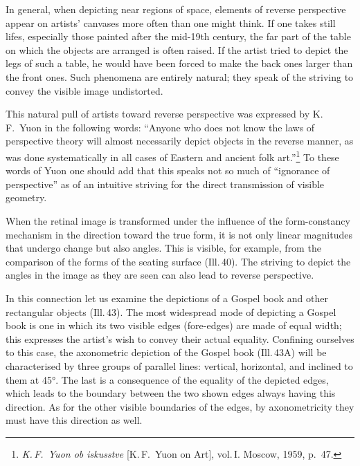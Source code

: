 

In general, when depicting near regions of space, elements of reverse perspective
appear on artists' canvases more often than one might think.  If one takes still
lifes, especially those painted after the mid-19th century, the far part of the table
on which the objects are arranged is often raised.  If the artist tried to depict the
legs of such a table, he would have been forced to make the back ones larger than the
front ones.  Such phenomena are entirely natural; they speak of the striving to
convey the visible image undistorted.

This natural pull of artists toward reverse perspective was expressed by K.\,F.~Yuon
in the following words: ``Anyone who does not know the laws of perspective theory
will almost necessarily depict objects in the reverse manner, as was done
systematically in all cases of Eastern and ancient folk art.''\footnote{%
  \emph{K.\,F.~Yuon ob iskusstve} [K.\,F.~Yuon on Art], vol.\,I.  Moscow, 1959,
  p.~47.}
To these words of Yuon one should add that this speaks not so much of ``ignorance of
perspective'' as of an intuitive striving for the direct transmission of visible
geometry.


When the retinal image is transformed under the influence of the form-constancy
mechanism in the direction toward the true form, it is not only linear magnitudes
that undergo change but also angles.  This is visible, for example, from the
comparison of the forms of the seating surface (Ill.\,40).  The striving to depict
the angles in the image as they are seen can also lead to reverse perspective.

In this connection let us examine the depictions of a Gospel book and other
rectangular objects (Ill.\,43).  The most widespread mode of depicting a Gospel book
is one in which its two visible edges (fore-edges) are made of equal width; this
expresses the artist's wish to convey their actual equality.  Confining ourselves to
this case, the axonometric depiction of the Gospel book (Ill.\,43A) will be
characterised by three groups of parallel lines: vertical, horizontal, and inclined
to them at 45°.  The last is a consequence of the equality of the depicted edges,
which leads to the boundary between the two shown edges always having this direction.
As for the other visible boundaries of the edges, by axonometricity they must have
this direction as well.

